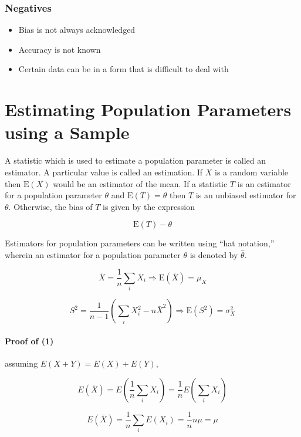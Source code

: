 \documentclass{article}
\begin{document}
\subsubsection{Negatives}

\begin{itemize}

    \item Bias is not always acknowledged 
    \item Accuracy is not known 
    \item Certain data can be in a form that is difficult to deal with

\end{itemize}

\section{Estimating Population Parameters using a Sample}

A statistic which is used to estimate a population parameter is called an
estimator. A particular value is called an estimation. If $X$ is a random
variable then $\textrm{E}(X)$ would be an estimator of the mean. If a statistic
$T$ is an estimator for a population parameter $\theta$ and
$\textrm{E}(T)=\theta$ then $T$ is an unbiased estimator for $\theta$.
Otherwise, the bias of $T$ is given by the expression

\[\textrm{E}(T)-\theta\]

\noindent Estimators for population parameters can be written using ``hat
notation,'' wherein an estimator for a population parameter $\theta$ is denoted
by $\hat{\theta}$.

\begin{equation}\bar{X}=\frac{1}{n}\sum_iX_i\Rightarrow
\textrm{E}(\bar{X})=\mu_X\end{equation}

\begin{equation}S^2=\frac{1}{n-1}\left(\sum_iX_i^2-n\bar{X}^2\right)\Rightarrow
\textrm{E}(S^2)=\sigma_X^2\end{equation}

\paragraph{Proof of (1)} assuming $E(X+Y)=E(X)+E(Y)$,

\[E(\bar{X})=E\left(\frac{1}{n}\sum_iX_i\right)=\frac{1}{n}E\left(\sum_iX_i\right)\]

\[E(\bar{X})=\frac{1}{n}\sum_iE(X_i)=\frac{1}{n}n\mu=\mu\]
\end{document}
